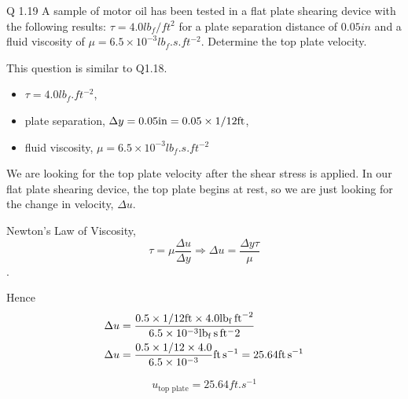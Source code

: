 
\begin{question}
  Q 1.19 A sample of motor oil has been tested in a flat plate shearing device with the following results: $\tau = 4.0 \si{lb_{f}/ft^2}$ for a plate separation distance of $0.05 \si{in}$ and a fluid viscosity of $\mu = 6.5 \times 10^{-3} \si{lb_f.s.ft^{-2}}$. Determine the top plate velocity.
\end{question}

\begin{solution} This question is similar to Q1.18.

  \begin{itemize}
    \item $\tau = 4.0 \si{lb_{f}.ft^{-2}}$,
    \item plate separation, $\Delta y = 0.05 \si{in} = 0.05 \x 1/12 \si{ft}$,
    \item fluid viscosity, $\mu = 6.5 \times 10^{-3} \si{lb_f.s.ft^{-2}}$
  \end{itemize}

  We are looking for the top plate velocity after the shear stress is applied. In our flat plate shearing device, the top plate begins at rest, so we are just looking for the change in velocity, $\Delta u$.

  Newton's Law of Viscosity,
  \begin{equation}
    \tau = \mu \frac{ \Delta u }{\Delta y} \Rightarrow \Delta u = \frac{ \Delta y \tau}{\mu}
  \end{equation}.

  Hence
  \begin{align*}
    \Delta u &= \frac{ 0.5 \x 1/12 \si{ft} \x 4.0 \si{lb_f.ft^{-2}} }{ 6.5 \x 10^{-3} \si{lb_f.s.ft{^-2}} } \\
    \Delta u &= \frac{ 0.5 \x 1/12 \x 4.0 }{ 6.5 \x 10^{-3}} \si{ft.s^{-1}} = 25.64 \si{ft.s^{-1}}
  \end{align*}

  \begin{equation*}
    \boxed{ u_{\text{top plate}} =  25.64 \si{ft.s^{-1}}}
  \end{equation*}
\end{solution}
